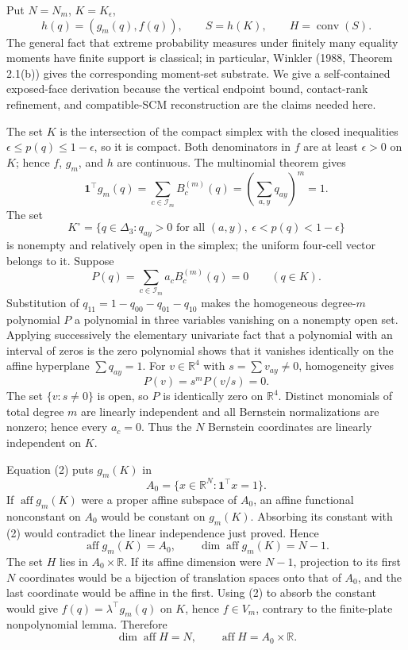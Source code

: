Put \(N=N_m\), \(K=K_{\epsilon}\),
\[
 h(q)=(g_m(q),f(q)),\qquad S=h(K),\qquad H=\operatorname{conv}(S).
\tag{1}
\]
The general fact that extreme probability measures under finitely many equality moments have finite support is classical; in particular, Winkler (1988, Theorem 2.1(b)) gives the corresponding moment-set substrate.  We give a self-contained exposed-face derivation because the vertical endpoint bound, contact-rank refinement, and compatible-SCM reconstruction are the claims needed here.

The set \(K\) is the intersection of the compact simplex with the closed inequalities \(\epsilon\leq p(q)\leq1-\epsilon\), so it is compact.  Both denominators in \(f\) are at least \(\epsilon>0\) on \(K\); hence \(f\), \(g_m\), and \(h\) are continuous.  The multinomial theorem gives
\[
 \mathbf 1^{\top}g_m(q)=\sum_{c\in\mathcal I_m}B_c^{(m)}(q)
 =\left(\sum_{a,y}q_{ay}\right)^m=1.
\tag{2}
\]
The set
\[
 K^{\circ}=\{q\in\Delta_3:q_{ay}>0\text{ for all }(a,y),\ \epsilon<p(q)<1-\epsilon\}
\tag{3}
\]
is nonempty and relatively open in the simplex; the uniform four-cell vector belongs to it.  Suppose
\[
 P(q)=\sum_{c\in\mathcal I_m}a_cB_c^{(m)}(q)=0\qquad(q\in K).
\tag{4}
\]
Substitution of \(q_{11}=1-q_{00}-q_{01}-q_{10}\) makes the homogeneous degree-\(m\) polynomial \(P\) a polynomial in three variables vanishing on a nonempty open set.  Applying successively the elementary univariate fact that a polynomial with an interval of zeros is the zero polynomial shows that it vanishes identically on the affine hyperplane \(\sum q_{ay}=1\).  For \(v\in\mathbb R^4\) with \(s=\sum v_{ay}\neq0\), homogeneity gives
\[
 P(v)=s^mP(v/s)=0.
\tag{5}
\]
The set \(\{v:s\neq0\}\) is open, so \(P\) is identically zero on \(\mathbb R^4\).  Distinct monomials of total degree \(m\) are linearly independent and all Bernstein normalizations are nonzero; hence every \(a_c=0\).  Thus the \(N\) Bernstein coordinates are linearly independent on \(K\).

Equation (2) puts \(g_m(K)\) in
\[
 A_0=\{x\in\mathbb R^N:\mathbf1^{\top}x=1\}.
\tag{6}
\]
If \(\operatorname{aff}g_m(K)\) were a proper affine subspace of \(A_0\), an affine functional nonconstant on \(A_0\) would be constant on \(g_m(K)\).  Absorbing its constant with (2) would contradict the linear independence just proved.  Hence
\[
 \operatorname{aff}g_m(K)=A_0,
 \qquad \dim\operatorname{aff}g_m(K)=N-1.
\tag{7}
\]
The set \(H\) lies in \(A_0\times\mathbb R\).  If its affine dimension were \(N-1\), projection to its first \(N\) coordinates would be a bijection of translation spaces onto that of \(A_0\), and the last coordinate would be affine in the first.  Using (2) to absorb the constant would give \(f(q)=\lambda^{\top}g_m(q)\) on \(K\), hence \(f\in V_m\), contrary to the finite-plate nonpolynomial lemma.  Therefore
\[
 \dim\operatorname{aff}H=N,
 \qquad \operatorname{aff}H=A_0\times\mathbb R.
\tag{8}
\]

